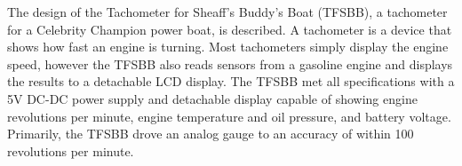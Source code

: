 The design of the Tachometer for Sheaff's Buddy's Boat (TFSBB), a tachometer for a Celebrity Champion power boat, is described. A tachometer is a device that shows how fast an engine is turning. Most tachometers simply display the engine speed, however the TFSBB also reads sensors from a gasoline engine and displays the results to a  detachable LCD display. The TFSBB met all specifications with a 5V DC-DC power supply and detachable display capable of showing engine revolutions per minute, engine temperature and oil pressure, and battery voltage. Primarily, the TFSBB drove an analog gauge to an accuracy of within 100 revolutions per minute.